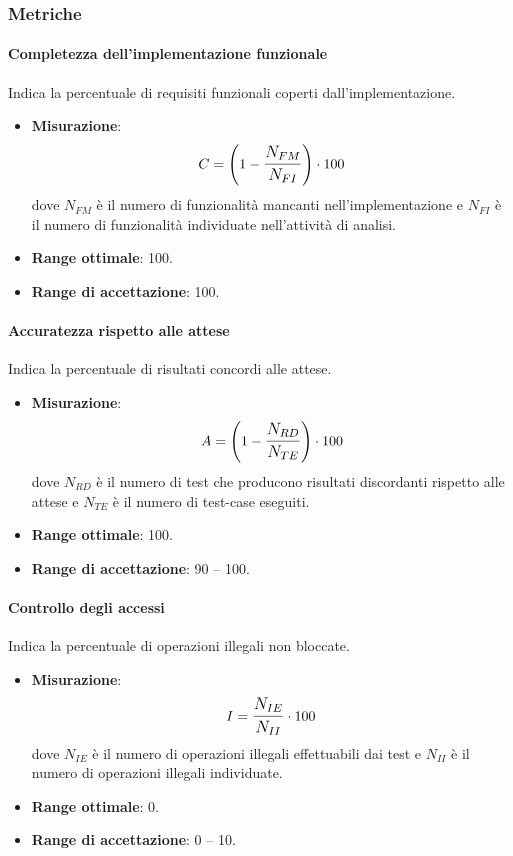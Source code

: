 \subsubsection{Metriche}
\paragraph{Completezza dell'implementazione funzionale}
Indica la percentuale di requisiti funzionali coperti dall'implementazione.
\begin{itemize}
	\item \textbf{Misurazione}: 
		$$C=\left(1-\mathlarger{\frac{N_{FM}}{N_{FI}}}\right) \cdot 100$$ 
	dove $N_{FM}$ è il numero di funzionalità mancanti nell'implementazione e $N_{FI}$ è il numero di funzionalità individuate nell'attività di analisi.
	\item \textbf{Range ottimale}: 100.
	\item \textbf{Range di accettazione}: 100.
\end{itemize}

\paragraph{Accuratezza rispetto alle attese}
Indica la percentuale di risultati concordi alle attese.
\begin{itemize}
	\item \textbf{Misurazione}: 
		$$A=\left(1-\mathlarger{\frac{N_{RD}}{N_{TE}}}\right) \cdot 100$$
	dove $N_{RD}$ è il numero di test che producono risultati discordanti rispetto alle attese e $N_{TE}$ è il numero di test-case eseguiti.
	\item \textbf{Range ottimale}: 100.
	\item \textbf{Range di accettazione}: 90 -- 100.
\end{itemize}

\paragraph{Controllo degli accessi}
Indica la percentuale di operazioni illegali non bloccate.
\begin{itemize}
	\item \textbf{Misurazione}: 
		$$I=\mathlarger{\frac{N_{IE}}{N_{II}}} \cdot 100$$
	dove $N_{IE}$ è il numero di operazioni illegali effettuabili dai test e $N_{II}$ è il numero di operazioni illegali individuate.
	\item \textbf{Range ottimale}: 0.
	\item \textbf{Range di accettazione}: 0 -- 10.
\end{itemize}


